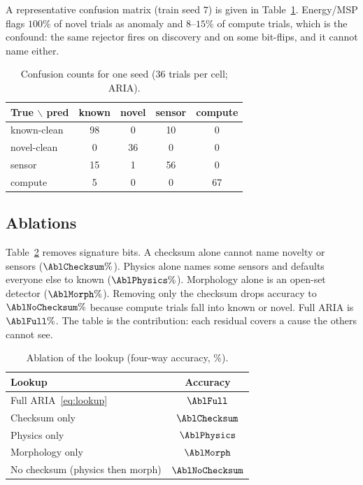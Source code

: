 \documentclass{ieeeaccess}
\begin{document}
A representative confusion matrix (train seed $7$) is given in Table~\ref{tab:conf}. Energy/MSP flags $100\%$ of novel trials as anomaly and $8$--$15\%$ of compute trials, which is the confound: the same rejector fires on discovery and on some bit-flips, and it cannot name either.

\begin{table}[!t]
\caption{Confusion counts for one seed ($36$ trials per cell; ARIA).}
\label{tab:conf}
\centering
\begin{tabular}{lcccc}
\toprule
True $\backslash$ pred & known & novel & sensor & compute \\
\midrule
known-clean & 98 & 0 & 10 & 0 \\
novel-clean & 0 & 36 & 0 & 0 \\
sensor & 15 & 1 & 56 & 0 \\
compute & 5 & 0 & 0 & 67 \\
\bottomrule
\end{tabular}
\end{table}

\subsection{Ablations}
Table~\ref{tab:abl} removes signature bits. A checksum alone cannot name novelty or sensors ($\AblChecksum\%$). Physics alone names some sensors and defaults everyone else to known ($\AblPhysics\%$). Morphology alone is an open-set detector ($\AblMorph\%$). Removing only the checksum drops accuracy to $\AblNoChecksum\%$ because compute trials fall into known or novel. Full ARIA is $\AblFull\%$. The table is the contribution: each residual covers a cause the others cannot see.

\begin{table}[!t]
\caption{Ablation of the lookup (four-way accuracy, \%).}
\label{tab:abl}
\centering
\begin{tabular}{lc}
\toprule
Lookup & Accuracy \\
\midrule
Full ARIA~\eqref{eq:lookup} & $\AblFull$ \\
Checksum only & $\AblChecksum$ \\
Physics only & $\AblPhysics$ \\
Morphology only & $\AblMorph$ \\
No checksum (physics then morph) & $\AblNoChecksum$ \\
\bottomrule
\end{tabular}
\end{table}
\end{document}
